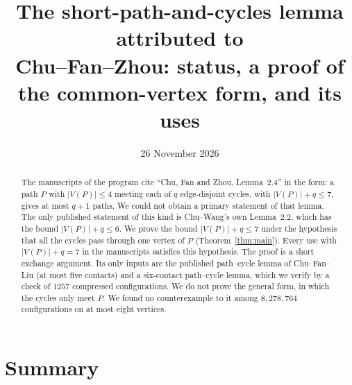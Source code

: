 \documentclass[11pt]{amsart}
\title[The short-path-and-cycles lemma]{The short-path-and-cycles lemma attributed to\\ Chu--Fan--Zhou: status, a proof of the common-vertex form, and its uses}
\date{26 November 2026}
\theoremstyle{definition}
\theoremstyle{remark}
\begin{document}
\begin{abstract}
The manuscripts of the program cite ``Chu, Fan and Zhou, Lemma~2.4'' in the form: a path $P$ with
$|V(P)|\le 4$ meeting each of $q$ edge-disjoint cycles, with $|V(P)|+q\le 7$, gives at most $q+1$
paths. We could not obtain a primary statement of that lemma. The only published statement of
this kind is Chu--Wang's own Lemma~2.2, which has the bound $|V(P)|+q\le 6$. We prove the bound
$|V(P)|+q\le 7$ under the hypothesis that all the cycles pass through one vertex of $P$
(Theorem~\ref{thm:main}). Every use with $|V(P)|+q=7$ in the manuscripts satisfies this
hypothesis. The proof is a short exchange argument. Its only inputs are the published path--cycle
lemma of Chu--Fan--Liu (at most five contacts) and a six-contact path--cycle lemma, which we verify
by a check of $1257$ compressed configurations. We do not prove the general form, in which the
cycles only meet $P$. We found no counterexample to it among $8{,}278{,}764$ configurations on at
most eight vertices.
\end{abstract}

\maketitle

\section{Summary}\label{sec:summary}
\end{document}
